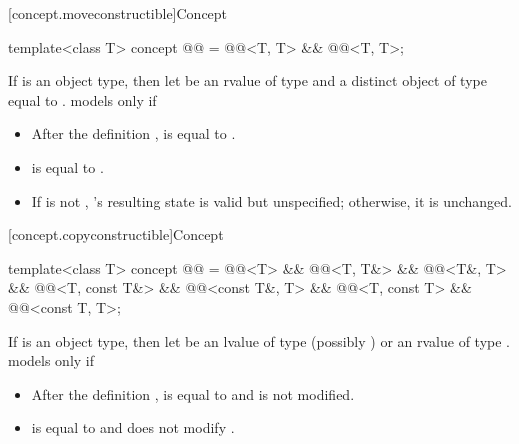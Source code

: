 [concept.moveconstructible]{Concept }

\begin{itemdecl}
template<class T>
  concept @@ = @@<T, T> && @@<T, T>;
\end{itemdecl}

\begin{itemdescr}
\pnum
If  is an object type, then let  be an rvalue of type
 and  a distinct object of type  equal to
.  models  only if

\begin{itemize}
\item After the definition ,  is equal to .

\item {} is equal to .

\item If  is not , 's resulting state is valid
but unspecified; otherwise, it is unchanged.
\end{itemize}
\end{itemdescr}

[concept.copyconstructible]{Concept }

\begin{itemdecl}
template<class T>
  concept @@ =
    @@<T> &&
    @@<T, T&> && @@<T&, T> &&
    @@<T, const T&> && @@<const T&, T> &&
    @@<T, const T> && @@<const T, T>;
\end{itemdecl}

\begin{itemdescr}
\pnum
If  is an object type, then let  be an lvalue of type
(possibly )  or an rvalue of type .
 models  only if

\begin{itemize}
\item After the definition ,
 is equal to  and
 is not modified.

\item {} is equal to  and does not modify .
\end{itemize}

\end{itemdescr}

